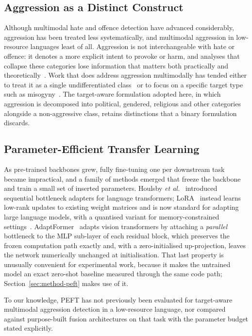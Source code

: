\documentclass[conference]{IEEEtran}
\begin{document}
\subsection{Aggression as a Distinct Construct}

Although multimodal hate and offence detection have advanced considerably,
aggression has been treated less systematically, and multimodal aggression in
low-resource languages least of all. Aggression is not interchangeable with hate
or offence: it denotes a more explicit intent to provoke or harm, and analyses
that collapse these categories lose information that matters both practically
and theoretically~\cite{kocon2021}. Work that does address aggression
multimodally has tended either to treat it as a single undifferentiated
class~\cite{kumari2021,hasan2025mulad} or to focus on a specific target type
such as misogyny~\cite{gasparini2022}. The target-aware formulation adopted
here, in which aggression is decomposed into political, gendered, religious and
other categories alongside a non-aggressive class, retains distinctions that a
binary formulation discards.

\subsection{Parameter-Efficient Transfer Learning}
\label{sec:related-peft}

As pre-trained backbones grew, fully fine-tuning one per downstream task became
impractical, and a family of methods emerged that freeze the backbone and train
a small set of inserted parameters. Houlsby \emph{et al.}~\cite{houlsby2019}
introduced sequential bottleneck adapters for language transformers;
LoRA~\cite{hu2021} instead learns low-rank updates to existing weight matrices
and is now standard for adapting large language models, with a quantised variant
for memory-constrained settings~\cite{dettmers2023}.
AdaptFormer~\cite{chen2022} adapts vision transformers by attaching a
\emph{parallel} bottleneck to the MLP sub-layer of each residual block, which
preserves the frozen computation path exactly and, with a zero-initialised
up-projection, leaves the network numerically unchanged at initialisation. That
last property is unusually convenient for experimental work, because it makes
the untrained model an exact zero-shot baseline measured through the same code
path; Section~\ref{sec:method-peft} makes use of it.

To our knowledge, PEFT has not previously been evaluated for target-aware
multimodal aggression detection in a low-resource language, nor compared against
purpose-built fusion architectures on that task with the parameter budget stated
explicitly.
\end{document}
